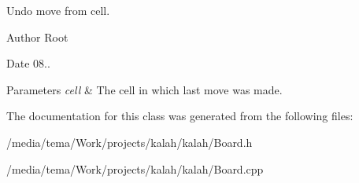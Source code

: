 Undo move from cell. 

\begin{DoxyAuthor}{Author}
Root 
\end{DoxyAuthor}
\begin{DoxyDate}{Date}
08..
\end{DoxyDate}

\begin{DoxyParams}{Parameters}
{\em cell} & The cell in which last move was made. \\
\hline
\end{DoxyParams}


The documentation for this class was generated from the following files\+:\begin{DoxyCompactItemize}
\item 
/media/tema/\+Work/projects/kalah/kalah/Board.\+h\item 
/media/tema/\+Work/projects/kalah/kalah/Board.\+cpp\end{DoxyCompactItemize}
